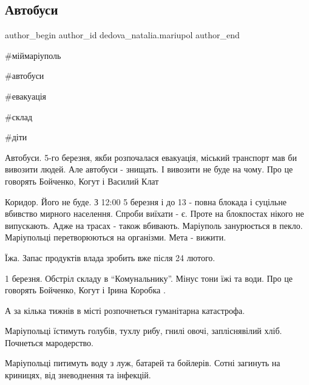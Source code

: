 
 
 
 
 

\subsection{Автобуси}
\label{sec:28_02_2023.fb.dedova_natalia.mariupol.1.avtobusy_koridor_evakuacia}

\ifcmt
 author_begin
   author_id dedova_natalia.mariupol
 author_end
\fi

\#міймаріуполь 

\#автобуси

\#евакуація

\#склад

\#діти

Автобуси. 5-го березня, якби розпочалася евакуація, міський транспорт мав би
вивозити людей. Але автобуси - знищать. І вивозити не буде на чому. Про це
говорять Бойченко, Когут і Василий Клат 

Коридор. Його не буде. З 12:00 5 березня і до 13 - повна блокада і суцільне
вбивство мирного населення. Спроби виїхати - є. Проте на блокпостах нікого не
випускають. Адже на трасах - також вбивають. Маріуполь занурюється в пекло.
Маріупольці перетворюються на організми. Мета - вижити. 

Їжа. Запас продуктів влада зробить вже після 24 лютого.

1 березня. Обстріл складу в \enquote{Комунальнику}. Мінус тони їжі та води. Про це
говорять Бойченко, Когут і Ірина Коробка . 

А за кілька тижнів в місті розпочнеться гуманітарна катастрофа. 

Маріупольці їстимуть голубів, тухлу рибу, гнилі овочі, запліснявілий хліб.
Почнеться мародерство. 

Маріупольці питимуть воду з луж, батарей та бойлерів. Сотні загинуть на
криницях, від зневоднення та інфекцій. 

